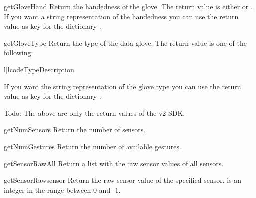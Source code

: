 \begin{methoddesc}{getGloveHand}{}
Return the handedness of the glove. The return value is either
 or . If you want a string
representation of the handedness you can use the return value as
key for the dictionary .
\end{methoddesc}

\begin{methoddesc}{getGloveType}{}
Return the type of the data glove. The return value is one of the following:

\begin{tableii}{l|l}{code}{Type}{Description}
\end{tableii}

If you want the string representation of the glove type you can use the
return value as key for the dictionary .

Todo: The above are only the return values of the v2 SDK.
\end{methoddesc}

\begin{methoddesc}{getNumSensors}{}
Return the number of sensors.
\end{methoddesc}

\begin{methoddesc}{getNumGestures}{}
Return the number of available gestures.
\end{methoddesc}

\begin{methoddesc}{getSensorRawAll}{}
Return a list with the raw sensor values of all sensors.
\end{methoddesc}

\begin{methoddesc}{getSensorRaw}{sensor}
Return the raw sensor value of the specified sensor.  is an
integer in the range between 0 and -1.
\end{methoddesc}


